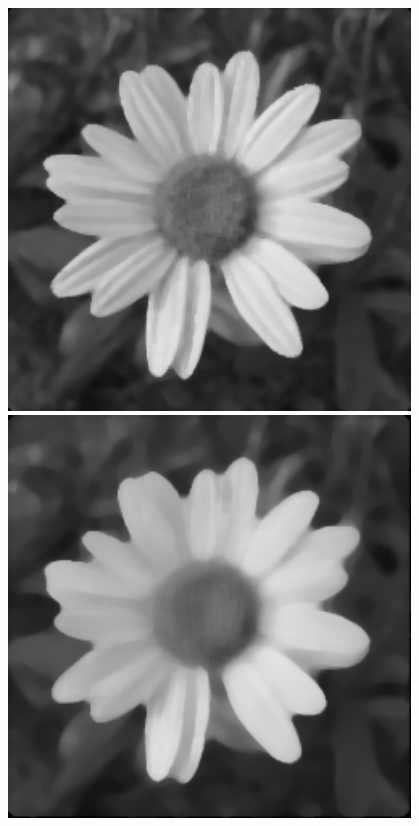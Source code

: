 \documentclass[a4paper]{report}
\begin{document}
\begin{figure}[H]
\centering
\begin{minipage}{.3\textwidth}
  \centering
    \includegraphics[width=0.95\textwidth]{images/Smooth/spatial-salt-n-pepper/flower_smooth_spatial_median_5_1.png}
\end{minipage}%
\begin{minipage}{.3\textwidth}
  \centering
    \includegraphics[width=0.95\textwidth]{images/Smooth/spatial-salt-n-pepper/flower_smooth_spatial_median_10_1.png}

\end{minipage}
\end{figure}
\end{document}

